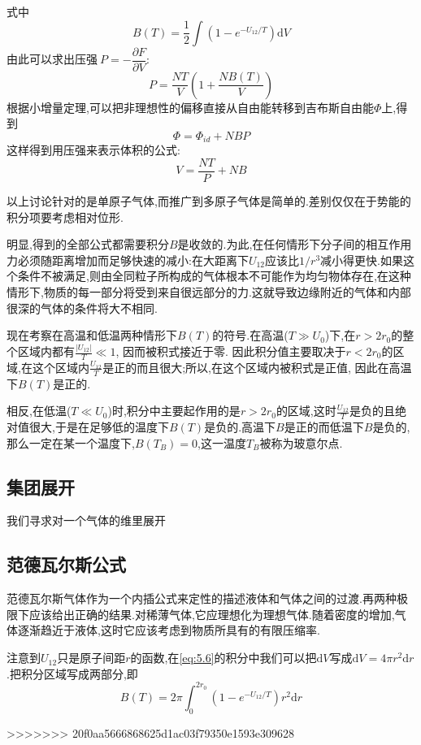   式中 
  \begin{equation}
    B(T)=\frac{1}{2}\int(1-e^{-U_{12} / T})\mathrm{d} V \label{eq:5.6}
  \end{equation}
  由此可以求出压强$~P=-\dfrac{\partial F}{\partial V}$:
  \begin{equation}
    P=\dfrac{NT}{V}\left( 1+\dfrac{NB(T)}{V} \right) 
  \end{equation}
  根据小增量定理,可以把非理想性的偏移直接从自由能转移到吉布斯自由能$\Phi$上,得到 
  \[\Phi=\Phi_{id}+NBP\]
  这样得到用压强来表示体积的公式:
  \begin{equation}
    V=\dfrac{NT}{P}+NB 
  \end{equation}

  以上讨论针对的是单原子气体,而推广到多原子气体是简单的.差别仅仅在于势能的积分项要考虑相对位形.

  明显,得到的全部公式都需要积分$B$是收敛的.为此,在任何情形下分子间的相互作用力必须随距离增加而足够快速的减小:在大距离下$U_{12}$应该比$1 / r^{3}$减小得更快.如果这个条件不被满足,则由全同粒子所构成的气体根本不可能作为均匀物体存在,在这种情形下,物质的每一部分将受到来自很远部分的力.这就导致边缘附近的气体和内部很深的气体的条件将大不相同.

  现在考察在高温和低温两种情形下$B(T)$的符号.在高温($T\gg U_0$)下,在$r>2r_{0}$的整个区域内都有$\frac{\left\vert U_{12} \right\vert}{T}\ll 1$, 因而被积式接近于零. 因此积分值主要取决于$r<2r_0$的区域,在这个区域内$\frac{U_{12}}{T}$是正的而且很大;所以,在这个区域内被积式是正值, 因此在高温下$B(T)$是正的.

  相反,在低温($T\ll U_0$)时,积分中主要起作用的是$r>2r_0$的区域,这时$ \frac{U_{12}}{T}$是负的且绝对值很大,于是在足够低的温度下$B(T)$是负的.高温下$B$是正的而低温下$B$是负的, 那么一定在某一个温度下,$B(T_B)=0$,这一温度$T_B$被称为玻意尔点.

\subsection{集团展开}
  我们寻求对一个气体的维里展开


\subsection{范德瓦尔斯公式}
  范德瓦尔斯气体作为一个内插公式来定性的描述液体和气体之间的过渡.再两种极限下应该给出正确的结果.对稀薄气体,它应理想化为理想气体.随着密度的增加,气体逐渐趋近于液体,这时它应该考虑到物质所具有的有限压缩率.

  注意到$U_{12}$只是原子间距$r$的函数,在\eqref{eq:5.6}的积分中我们可以把$\mathrm{d} V$写成$\mathrm{d}  V= 4\pi r^{2}\mathrm{d} r$.把积分区域写成两部分,即
  \[B(T)=2\pi \int_{0}^{2r_0}(1-e^{-U_{12} / T})r^{2}\mathrm{d} r\]
  
>>>>>>> 20f0aa5666868625d1ac03f79350e1593e309628
